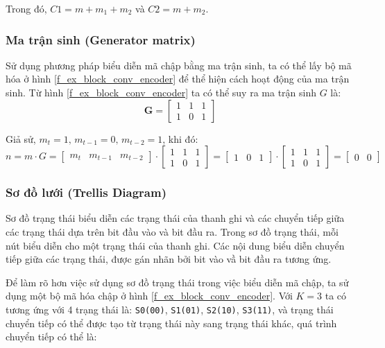 Trong đó, $C1 = m + m_1 + m_2$ và $C2 = m + m_2$.

\subsubsection{Ma trận sinh (Generator matrix)}

Sử dụng phương pháp biểu diễn mã chập bằng ma trận sinh, ta có thể lấy bộ mã hóa ở hình \ref{f_ex_block_conv_encoder} để thể hiện cách hoạt động của ma trận sinh. Từ hình \ref{f_ex_block_conv_encoder} ta có thể suy ra ma trận sinh $G$ là:
\[
\mathbf{G} = 
\begin{bmatrix}
	1 & 1 & 1 \\
	1 & 0 & 1 	
\end{bmatrix}
\]

Giả sử, $m_t = 1\text{, } m_{t - 1} = 0\text{, } m_{t - 2} = 1$, khi đó:
\[n = m \cdot G = \begin{bmatrix}
	m_t & m_{t - 1} & m_{t - 2}
\end{bmatrix} \cdot \begin{bmatrix}
	1 & 1 & 1 \\
	1 & 0 & 1 	
\end{bmatrix} = \begin{bmatrix}
	1 & 0 & 1
\end{bmatrix} \cdot \begin{bmatrix}
	1 & 1 & 1 \\
	1 & 0 & 1 	
\end{bmatrix} = \begin{bmatrix}
	0 & 0
\end{bmatrix}\]

\subsubsection{Sơ đồ lưới (Trellis Diagram)}

Sơ đồ trạng thái biểu diễn các trạng thái của thanh ghi và các chuyển tiếp giữa các trạng thái dựa trên bit đầu vào và bit đầu ra. Trong sơ đồ trạng thái, mỗi nút biểu diễn cho một trạng thái của thanh ghi. Các nội dung biểu diễn chuyển tiếp giữa các trạng thái, được gán nhãn bởi bit vào vầ bit đầu ra tương ứng. 

Để làm rõ hơn việc sử dụng sơ đồ trạng thái trong việc biểu diễn mã chập, ta sử dụng một bộ mã hóa chập ở hình \ref{f_ex_block_conv_encoder}. Với $K=3$ ta có tương ứng với 4 trạng thái là: \texttt{S0(00)}, \texttt{S1(01)}, \texttt{S2(10)}, \texttt{S3(11)}, và trạng thái chuyển tiếp có thể được tạo từ trạng thái này sang trạng thái khác, quá trình chuyển tiếp có thể là:


